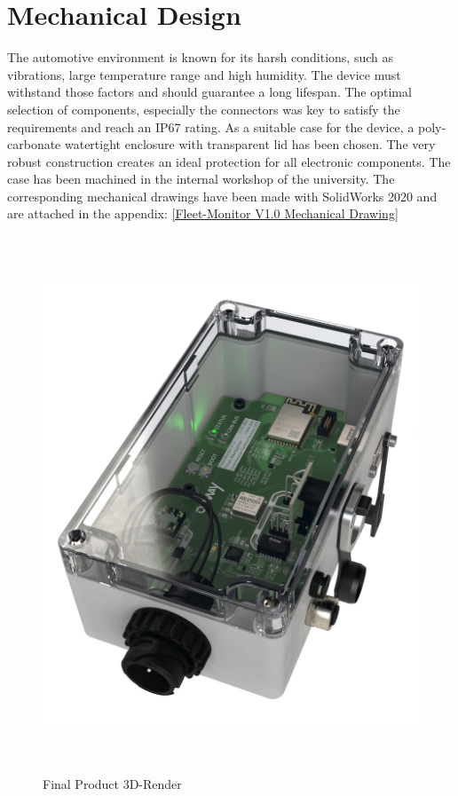 \section{Mechanical Design}
The automotive environment is known for its harsh conditions, such as vibrations, large temperature range and high humidity. The device must withstand those factors and should guarantee a long lifespan. The optimal selection of components, especially the connectors was key to satisfy the requirements and reach an IP67 rating.\newline
As a suitable case for the device, a poly-carbonate watertight enclosure with transparent lid has been chosen. The very robust construction creates an ideal protection for all electronic components.\newline
The case has been machined in the internal workshop of the university. The corresponding mechanical drawings have been made with SolidWorks 2020 and are attached in the appendix: \ref{Fleet-Monitor V1.0 Mechanical Drawing}

\medskip
\begin{figure}[h!]
	\centering
	\includegraphics[height=16cm]{images/fleet-monitor-rendering}
	\caption{Final Product 3D-Render}
	\label{fig:fleet-monitor-rendering}
\end{figure}
\newpage

